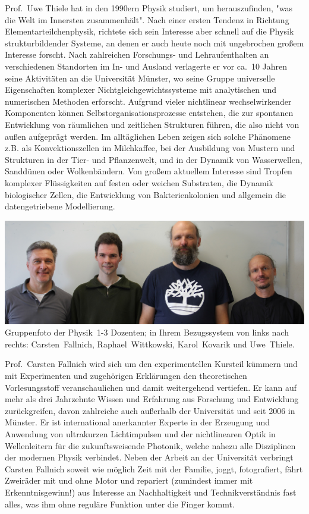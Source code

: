 \begin{multicols}{2}
Prof.\ Uwe Thiele hat in den 1990ern Physik studiert, um herauszufinden, "was die Welt im Innersten zusammenhält". Nach einer ersten Tendenz in Richtung Elementarteilchenphysik, richtete sich sein Interesse aber schnell auf die Physik strukturbildender Systeme, an denen er auch heute noch mit ungebrochen großem Interesse forscht. Nach zahlreichen Forschungs- und Lehraufenthalten an verschiedenen Standorten im In- und Ausland verlagerte er vor ca.\ 10 Jahren seine Aktivitäten an die Universität Münster, wo seine Gruppe universelle Eigenschaften komplexer Nichtgleichgewichtssysteme mit analytischen und numerischen Methoden erforscht. Aufgrund vieler nichtlinear wechselwirkender Komponenten können Selbstorganisationsprozesse entstehen, die zur spontanen Entwicklung von räumlichen und zeitlichen Strukturen führen, die also nicht von au{\ss}en aufgeprägt werden. Im alltäglichen Leben zeigen sich solche Phänomene z.B. als Konvektionszellen im Milchkaffee, bei der Ausbildung von Mustern und Strukturen in der Tier- und Pflanzenwelt, und in der Dynamik von Wasserwellen, Sanddünen oder Wolkenbändern. Von gro{\ss}em aktuellem Interesse sind Tropfen komplexer Flüssigkeiten auf festen oder weichen Substraten, die Dynamik biologischer Zellen, die Entwicklung von Bakterienkolonien und allgemein die datengetriebene Modellierung.

\begin{center}
\includegraphics[width=0.8\columnwidth]{res/vorstellungsfotos/profs_ws23.jpg}\\
\smallskip
Gruppenfoto der Physik~1-3 Dozenten; in Ihrem Bezugssystem von links nach rechts: Carsten~Fallnich, Raphael~Wittkowski, Karol~Kovarik und Uwe~Thiele.
\end{center}

\newpage

Prof.\ Carsten Fallnich wird sich um den experimentellen Kursteil kümmern und mit Experimenten und zugehörigen Erklärungen den theoretischen Vorlesungsstoff veranschaulichen und damit weitergehend vertiefen. Er kann auf mehr als drei Jahrzehnte Wissen und Erfahrung aus Forschung und Entwicklung zurückgreifen, davon zahlreiche auch außerhalb der Universität und seit 2006 in Münster. Er ist international anerkannter Experte in der Erzeugung und Anwendung von ultrakurzen Lichtimpulsen und der nichtlinearen Optik in Wellenleitern für die zukunftsweisende Photonik, welche nahezu alle Disziplinen der modernen Physik verbindet. Neben der Arbeit an der Universität verbringt Carsten Fallnich soweit wie möglich Zeit mit der Familie, joggt, fotografiert, fährt Zweiräder mit und ohne Motor und repariert (zumindest immer mit Erkenntnisgewinn!) aus Interesse an Nachhaltigkeit und Technikverständnis fast alles, was ihm ohne reguläre Funktion unter die Finger kommt.


\end{multicols}
